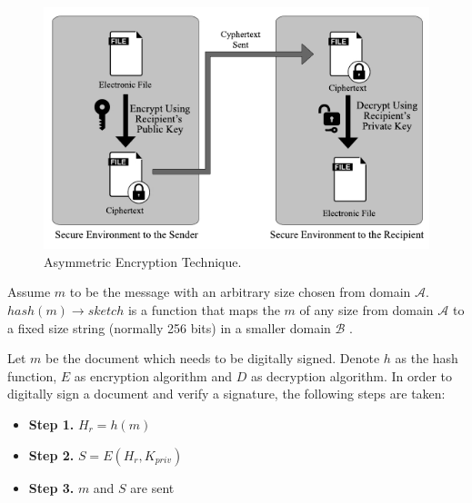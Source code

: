		\begin{figure}
			\centering
			\includegraphics[width=\textwidth]{figs/asymmetricEncryption.pdf}
			\caption{Asymmetric Encryption Technique.}
			\label{fig:AssymmetricEncryption}
		\end{figure}
		\begin{defn}
			Assume $m$ to be the message with an arbitrary size chosen from domain $\mathcal{A}$. $hash(m)\rightarrow sketch$ is a function that maps the $m$ of any size from domain $\mathcal{A}$ to a fixed size string (normally 256 bits) in a smaller domain $\mathcal{B}$ \cite{aumasson2014thehash}.
		\label{dfn:hash_function}
		\end{defn}
		\begin{defn} 
			Let $m$ be the document which needs to be digitally signed. Denote $h$ as the hash function, $E$ as encryption algorithm and $D$ as decryption algorithm. In order to digitally sign a document and verify a signature, the following steps are taken:
			\begin{itemize}
				\item \textbf{Step 1.} $H_r = h(m)$
				\item \textbf{Step 2.} $S = E(H_r,K_{priv})$
				\item \textbf{Step 3.} $m$ and $S$ are sent
			\end{itemize}
		\label{dfn:digital_signature}
		\end{defn}


